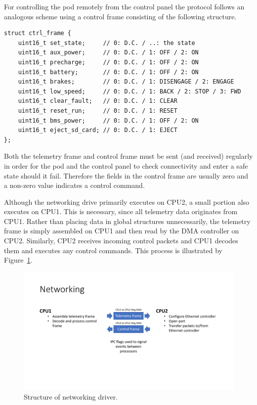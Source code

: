 For controlling the pod remotely from the control panel the protocol follows an analogous scheme using a control frame consisting of the following structure.

\begin{verbatim}
struct ctrl_frame {
    uint16_t set_state;     // 0: D.C. / ..: the state
    uint16_t aux_power;     // 0: D.C. / 1: OFF / 2: ON
    uint16_t precharge;     // 0: D.C. / 1: OFF / 2: ON
    uint16_t battery;       // 0: D.C. / 1: OFF / 2: ON
    uint16_t brakes;        // 0: D.C. / 1: DISENGAGE / 2: ENGAGE
    uint16_t low_speed;     // 0: D.C. / 1: BACK / 2: STOP / 3: FWD
    uint16_t clear_fault;   // 0: D.C. / 1: CLEAR
    uint16_t reset_run;     // 0: D.C. / 1: RESET
    uint16_t bms_power;     // 0: D.C. / 1: OFF / 2: ON
    uint16_t eject_sd_card; // 0: D.C. / 1: EJECT
};
\end{verbatim}

Both the telemetry frame and control frame must be sent (and received) regularly in order for the pod and the control panel to check connectivity and enter a safe state should it fail. Therefore the fields in the control frame are usually zero and a non-zero value indicates a control command.

Although the networking drive primarily executes on CPU2, a small portion also executes on CPU1. This is necessary, since all telemetry data originates from CPU1. Rather than placing data in global structures unnecessarily, the telemetry frame is simply assembled on CPU1 and then read by the DMA controller on CPU2. Similarly, CPU2 receives incoming control packets and CPU1 decodes them and executes any control commands. This process is illustrated by Figure~\ref{fig:networking_structure}.

\begin{figure}[H]
    \centering \includegraphics[width=1.0\textwidth]{./figures/networking_structure.pdf}
    \caption{Structure of networking driver.}
    \label{fig:networking_structure}
\end{figure}


